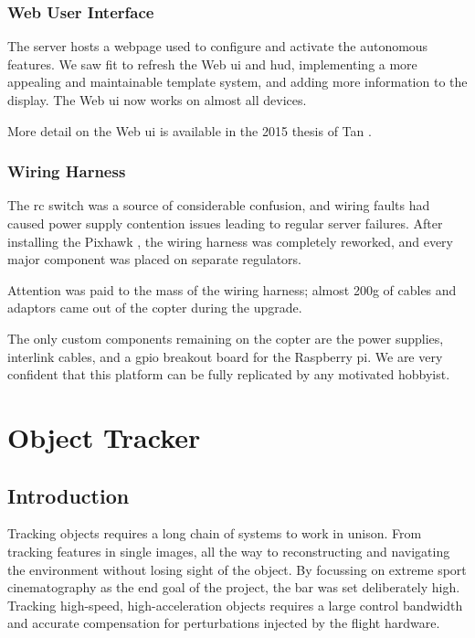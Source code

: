 \documentclass[a4paper, 11pt, titlepage]{article}
\begin{document}
    \subsubsection{Web User Interface}
      The server hosts a webpage used to configure and activate the autonomous features.
      We saw fit to refresh the Web \gls{ui} and \gls{hud}, implementing a more appealing and maintainable template system, and adding more information to the display.
      The Web \gls{ui} now works on almost all devices.

      More detail on the Web \gls{ui} is available in the 2015 thesis of Tan \cite{Tan}.

    \subsubsection{Wiring Harness}
      The \gls{rc} switch was a source of considerable confusion, and wiring faults had caused power supply contention issues leading to regular server failures.
      After installing the Pixhawk \cite{3dr-pixhawk}, the wiring harness was completely reworked, and every major component was placed on separate regulators.

      Attention was paid to the mass of the wiring harness; almost 200g of cables and adaptors came out of the copter during the upgrade.

      The only custom components remaining on the copter are the power supplies, interlink cables, and a \gls{gpio} breakout board for the Raspberry pi.  We are very confident that this platform can be fully replicated by any motivated hobbyist.

\section{Object Tracker}
  \subsection{Introduction}

    Tracking objects requires a long chain of systems to work in unison.  From tracking features in single images, all the way to reconstructing and navigating the environment without losing sight of the object.
    By focussing on extreme sport cinematography as the end goal of the project, the bar was set deliberately high.
    Tracking high-speed, high-acceleration objects requires a large control bandwidth and accurate compensation for perturbations injected by the flight hardware.  
\end{document}
